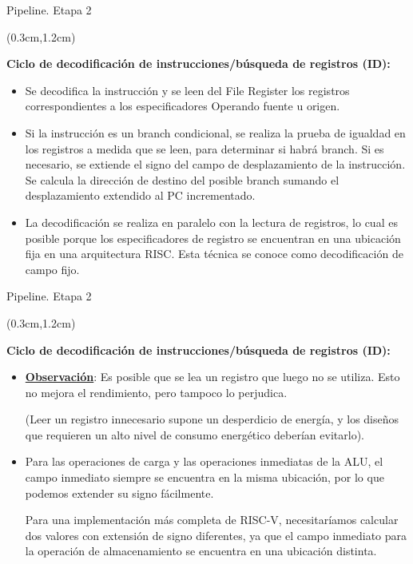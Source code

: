 \documentclass[table,dvipsnames,aspectratio=169]{beamer}
\begin{document}
\begin{frame}{Pipeline. Etapa 2}
 \begin{textblock*}{\textwidth}(0.3cm,1.2cm)
  \begin{tcolorbox}[enhanced jigsaw,rounded corners, drop fuzzy shadow=ShadowColor]

   \textbf{\color{Blue}Ciclo de decodificación de instrucciones/búsqueda de registros (ID):}

   \begin{itemize}[<+(1)->]\justifying
    \item Se decodifica la instrucción y se leen del File Register los registros correspondientes a los especificadores Operando fuente u origen.
    \item Si la instrucción es un branch condicional, se realiza la prueba de igualdad en los registros a medida que se leen, para determinar si habrá branch. Si es necesario, se extiende el signo del campo de desplazamiento de la instrucción. Se calcula la dirección de destino del posible branch sumando el desplazamiento extendido al PC incrementado.
    \item La decodificación se realiza en paralelo con la lectura de registros, lo cual es posible porque los especificadores de registro se encuentran en una ubicación fija en una arquitectura RISC. Esta técnica se conoce como decodificación de campo fijo.
   \end{itemize}
  \end{tcolorbox}
 \end{textblock*}
\end{frame}

\begin{frame}{Pipeline. Etapa 2}
 \begin{textblock*}{\textwidth}(0.3cm,1.2cm)
  \begin{tcolorbox}[enhanced jigsaw,rounded corners, drop fuzzy shadow=ShadowColor]

   \textbf{\color{Blue}Ciclo de decodificación de instrucciones/búsqueda de registros (ID):}

   \begin{itemize}[<+(1)->]\justifying
    \item \textbf{\underline{Observación}}: Es posible que se lea un registro que luego no se utiliza. Esto no mejora el rendimiento, pero tampoco lo perjudica.

    (Leer un registro innecesario supone un desperdicio de energía, y los diseños que requieren un alto nivel de consumo energético deberían evitarlo).
    \item Para las operaciones de carga y las operaciones inmediatas de la ALU, el campo inmediato siempre se encuentra en la misma ubicación, por lo que podemos extender su signo fácilmente.

    Para una implementación más completa de RISC-V, necesitaríamos calcular dos valores con extensión de signo diferentes, ya que el campo inmediato para la operación de almacenamiento se encuentra en una ubicación distinta.
   \end{itemize}
  \end{tcolorbox}
 \end{textblock*}
\end{frame}
\end{document}
